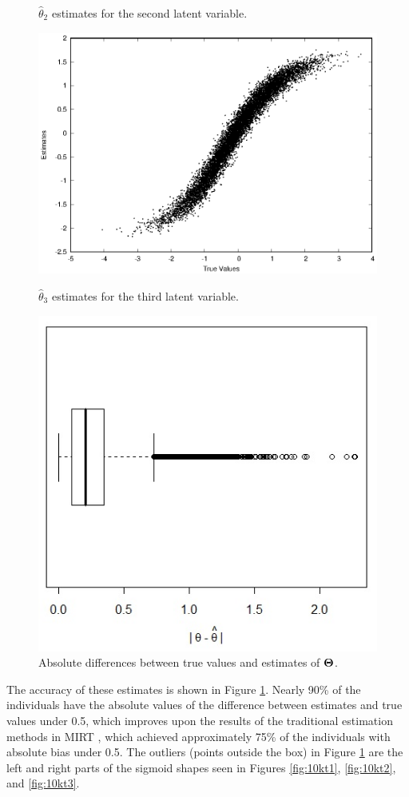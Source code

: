 \begin{figure}[h!]
\caption{$\hat{\theta}_2$ estimates for the second latent variable.}
\label{fig:10kt2}
\endminipage\hfill
\linebreak
{}
\includegraphics[width=\textwidth]{img/ijcnn_results/10k_t3_scaled.eps}
\caption{$\hat{\theta}_3$ estimates for the third latent variable.}
\label{fig:10kt3}
\endminipage\hfill
{}
\includegraphics[height=0.7\textwidth,width=\columnwidth]{img/ijcnn_results/BxpTheta.jpg}
\caption{Absolute differences between true values and estimates of $\boldsymbol{\Theta}$.}
\label{fig:boxt10k}
\endminipage\hfill
\end{figure}


The accuracy of these estimates is shown in Figure \ref{fig:boxt10k}. Nearly 90\% of the individuals have the absolute values of the difference between estimates and true values under 0.5, which improves upon the results of the traditional estimation methods in MIRT \cite{daSilva2018}, which achieved approximately 75\% of the individuals with absolute bias under 0.5. The outliers (points outside the box) in Figure \ref{fig:boxt10k} are the left and right parts of the sigmoid shapes seen in Figures \ref{fig:10kt1}, \ref{fig:10kt2}, and \ref{fig:10kt3}.

